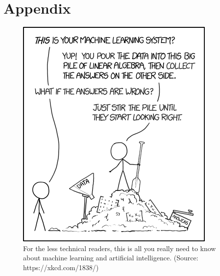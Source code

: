 \documentclass{notes}
\begin{document}
  \section{Appendix}
    \begin{figure}[!htb]
      \label{fig:xkcd-ml}
    \centering
      \includegraphics[width=0.6\linewidth]{figures/xkcd-ml.png}
    \caption{For the less technical readers, this is all you really need to know about machine learning and artificial intelligence. (Source: https://xkcd.com/1838/)}
    \end{figure}
\end{document}
